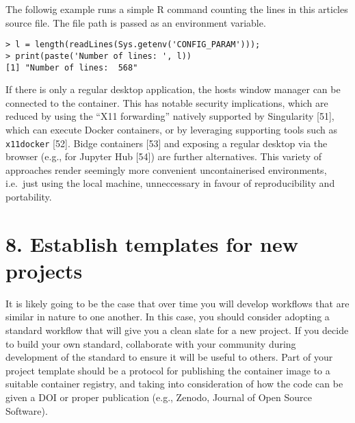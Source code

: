 \documentclass[10pt,letterpaper]{article}
\newenvironment{Shaded}{\begin{snugshade}}{\end{snugshade}}
\newcommand{\BuiltInTok}[1]{#1}
\newcommand{\ExtensionTok}[1]{#1}
\newcommand{\NormalTok}[1]{#1}
\newcommand{\StringTok}[1]{\textcolor[rgb]{0.31,0.60,0.02}{#1}}
\newcommand{\VariableTok}[1]{\textcolor[rgb]{0.00,0.00,0.00}{#1}}
\begin{document}
The followig example runs a simple R command counting the lines in this
articles source file. The file path is passed as an environment
variable.

\begin{Shaded}
\end{Shaded}

\begin{verbatim}
> l = length(readLines(Sys.getenv('CONFIG_PARAM')));
> print(paste('Number of lines: ', l))
[1] "Number of lines:  568"
\end{verbatim}

If there is only a regular desktop application, the hosts window manager
can be connected to the container. This has notable security
implications, which are reduced by using the ``X11 forwarding'' natively
supported by Singularity {[}51{]}, which can execute Docker containers,
or by leveraging supporting tools such as \texttt{x11docker} {[}52{]}.
Bidge containers {[}53{]} and exposing a regular desktop via the browser
(e.g., for Jupyter Hub {[}54{]}) are further alternatives. This variety
of approaches render seemingly more convenient uncontainerised
environments, i.e.~just using the local machine, unneccessary in favour
of reproducibility and portability.

\hypertarget{establish-templates-for-new-projects}{%
\section*{8. Establish templates for new
projects}\label{establish-templates-for-new-projects}}

  \label{rule:templates} 

It is likely going to be the case that over time you will develop
workflows that are similar in nature to one another. In this case, you
should consider adopting a standard workflow that will give you a clean
slate for a new project. If you decide to build your own standard,
collaborate with your community during development of the standard to
ensure it will be useful to others. Part of your project template should
be a protocol for publishing the container image to a suitable container
registry, and taking into consideration of how the code can be given a
DOI or proper publication (e.g., Zenodo, Journal of Open Source
Software).
\end{document}
